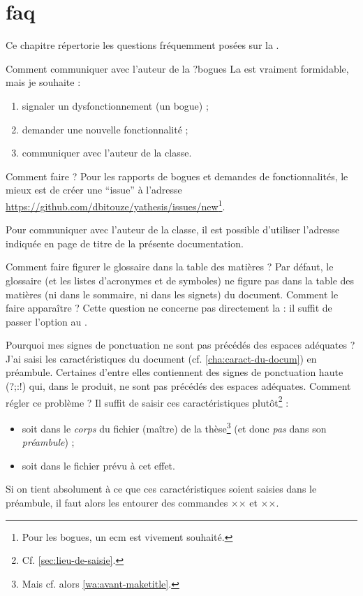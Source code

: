 \chapter{\texorpdfstring{\acrshort{faq}}{FAQ}}\label{cha:faq}

Ce chapitre répertorie les questions fréquemment posées sur la \yatcl{}.

\begin{dbfaq}{Comment communiquer avec l'auteur de la \yatcl{} ?}{bogues}
  La \yatcl{} est vraiment formidable, mais je souhaite :
  \begin{enumerate}
  \item signaler un dysfonctionnement (un bogue) ;
  \item demander une nouvelle fonctionnalité ;
  \item communiquer avec l'auteur de la classe.
  \end{enumerate}
  Comment faire ?
  \tcblower
  Pour les rapports de bogues et demandes de fonctionnalités, le mieux est de
  créer une \enquote{issue} à l'adresse
  \url{https://github.com/dbitouze/yathesis/issues/new}\footnote{Pour les bogues, un
  \gls{ecm} est vivement souhaité.}.

  Pour communiquer avec l'auteur de la classe, il est possible d'utiliser l'adresse indiquée en
  page de titre de la présente documentation.
\end{dbfaq}

\begin{dbfaq}{Comment faire figurer le glossaire dans la table des matières ?}{}
  Par défaut, le glossaire (et les listes d'acronymes et de symboles) ne figure
  pas dans la table des matières (ni dans le sommaire, ni dans les signets) du
  document. Comment le faire apparaître ?
  \tcblower
  Cette question ne concerne pas directement la \yatcl{} : il suffit de passer
  l'option  au .
\end{dbfaq}

\begin{dbfaq}{Pourquoi mes signes de ponctuation ne sont pas précédés
    des espaces adéquates ?}{}
  J'ai saisi les caractéristiques du document (cf. \vref{cha:caract-du-docum})
  en préambule. Certaines d'entre elles contiennent des signes de ponctuation
  haute ({\NoAutoSpacing?;:!}) qui, dans le \pdf produit, ne sont pas précédés
  des espaces adéquates. Comment régler ce problème ?
  \tcblower
  Il suffit de saisir ces caractéristiques
  plutôt\footnote{Cf. \vref{sec:lieu-de-saisie}.} :
  \begin{itemize}
  \item soit dans le \emph{corps} du fichier (maître) de la thèse\footnote{Mais
      cf. alors \vref{wa:avant-maketitle}.} (et donc \emph{pas} dans son
    \emph{préambule}) ;
  \item soit dans le fichier \file{\characteristicsfile} prévu à cet effet.
  \end{itemize}
  Si on tient absolument à ce que ces caractéristiques soient saisies dans le
  préambule, il faut alors les entourer des commandes ×× et
  ××.
\end{dbfaq}

